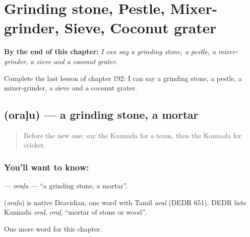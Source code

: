 
\chapter{Grinding stone, Pestle, Mixer-grinder, Sieve, Coconut grater}
\label{ch:ka-grinding-stone-pestle-mixer-grinder-sieve-coconut-grater}

\begin{chapteropening}
\textbf{By the end of this chapter:} \emph{I can say a grinding stone, a pestle, a mixer-grinder, a sieve and a coconut grater.}

Complete the last lesson of chapter 192: I can say a grinding stone, a pestle, a mixer-grinder, a sieve and a coconut grater.
\end{chapteropening}

\section[\texorpdfstring{\kn{ಒರಳು} (oraḷu)}{ಒರಳು (oraḷu)}]{ (oraḷu) — a grinding stone, a mortar}

\label{lesson:KA-C192-oralu}



\begin{quote}
Before the new one: say the Kannada for a team, then the Kannada for cricket.
\end{quote}

\subsection*{You'll want to know: }
\textbf{} — \emph{oraḷu} — \textquotedblleft{}a grinding stone, a mortar\textquotedblright{}.

\begin{cousinweb}
\textbf{} (\emph{oraḷu}) is native Dravidian, one word with Tamil \emph{ural} (DEDR 651). DEDR lists Kannada \emph{oral}, \emph{oraḷ}, \textquotedblleft{}mortar of stone or wood\textquotedblright{}.
\end{cousinweb}

\begin{grammarlens}[title={What you've built}]
One more word for this chapter.
\end{grammarlens}

